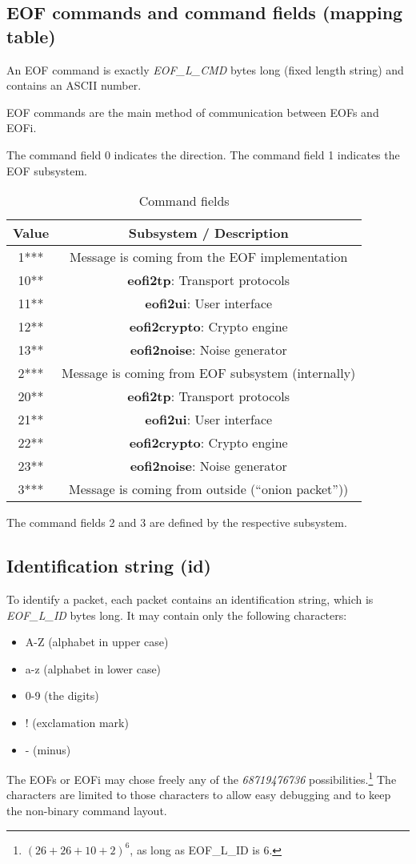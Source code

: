 \documentclass[12pt,a4paper]{book}
\begin{document}
\subsection{EOF commands and command fields (mapping table)}
An EOF command is exactly \emph{EOF\_L\_CMD} bytes long (fixed length string)
and contains an ASCII number.

EOF commands are the main method of communication between EOFs and EOFi.

The command field 0 indicates the direction.
The command field 1 indicates the EOF subsystem.
\begin{longtable}{|c|c|}
\caption{Command fields}\\
\hline
\textbf{Value} & \textbf{Subsystem} / \textbf{Description}\\
\hline
1*** & Message is coming from the EOF implementation\\
\hline
10** & \textbf{eofi2tp}: Transport protocols\\
\hline
11** & \textbf{eofi2ui}: User interface\\
\hline
12** & \textbf{eofi2crypto}: Crypto engine\\
\hline
13** & \textbf{eofi2noise}: Noise generator\\
\hline
2*** & Message is coming from EOF subsystem (internally)\\
\hline
20** & \textbf{eofi2tp}: Transport protocols\\
\hline
21** & \textbf{eofi2ui}: User interface\\
\hline
22** & \textbf{eofi2crypto}: Crypto engine\\
\hline
23** & \textbf{eofi2noise}: Noise generator\\
\hline
3*** & Message is coming from outside ("`onion packet"'))\\
\hline
\end{longtable}
The command fields 2 and 3 are defined by the respective subsystem.
\subsection{Identification string (id)}
\label{idn}
To identify a packet, each packet contains an identification string,
which is \emph{EOF\_L\_ID} bytes long. It may contain only the
following characters:
\begin{itemize}
\item A-Z (alphabet in upper case)
\item a-z (alphabet in lower case)
\item 0-9 (the digits)
\item ! (exclamation mark)
\item - (minus)
\end{itemize}
The EOFs or EOFi may chose freely any of the \emph{68719476736}
possibilities.\footnote{$(26+26+10+2)^6$, as long as EOF\_L\_ID is 6.}
The characters are limited to those characters to allow easy debugging
and to keep the non-binary command layout.
\end{document}
